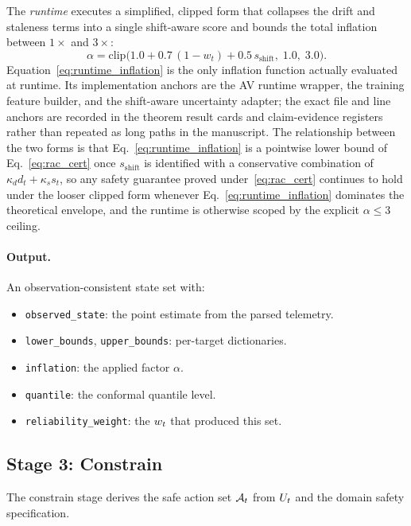 The \emph{runtime} executes a simplified, clipped form that collapses the drift
and staleness terms into a single shift-aware score and bounds the total
inflation between $1\times$ and $3\times$:
\begin{equation}\label{eq:runtime_inflation}
  \boxed{\;
  \alpha = \mathrm{clip}\!\bigl(1.0 + 0.7\,(1 - w_t) + 0.5\,s_{\mathrm{shift}},
  \; 1.0,\; 3.0\bigr).
  \;}
\end{equation}
Equation~\eqref{eq:runtime_inflation} is the only inflation function actually
evaluated at runtime.  Its implementation anchors are the AV runtime wrapper,
the training feature builder, and the shift-aware uncertainty adapter; the exact
file and line anchors are recorded in the theorem result cards and claim-evidence
registers rather than repeated as long paths in the manuscript.
The relationship between the two forms is that
Eq.~\eqref{eq:runtime_inflation} is a pointwise lower bound of
Eq.~\eqref{eq:rac_cert} once $s_{\mathrm{shift}}$ is identified with a
conservative combination of $\kappa_d d_t + \kappa_s s_t$, so any safety
guarantee proved under~\eqref{eq:rac_cert} continues to hold under the looser
clipped form whenever Eq.~\eqref{eq:runtime_inflation} dominates the
theoretical envelope, and the runtime is otherwise scoped by the explicit
$\alpha \le 3$ ceiling.

\paragraph{Output.}  An observation-consistent state set with:
\begin{itemize}[nosep]
  \item \texttt{observed\_state}: the point estimate from the parsed telemetry.
  \item \texttt{lower\_bounds}, \texttt{upper\_bounds}: per-target dictionaries.
  \item \texttt{inflation}: the applied factor $\alpha$.
  \item \texttt{quantile}: the conformal quantile level.
  \item \texttt{reliability\_weight}: the $w_t$ that produced this set.
\end{itemize}

\subsection{Stage 3: Constrain}\label{sec:constrain}

The constrain stage derives the safe action set $\mathcal{A}_t$ from $U_t$ and the domain
safety specification.

